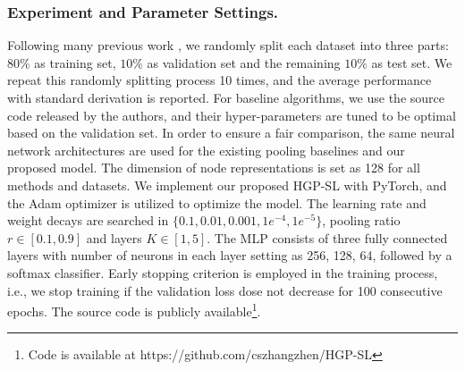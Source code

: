 \documentclass[letterpaper]{article} \usepackage{aaai20}  \usepackage{times}  \usepackage{helvet} \usepackage{courier}  \usepackage[hyphens]{url}  \usepackage{graphicx} \urlstyle{rm} \def\UrlFont{\rm}  \usepackage{graphicx}  \frenchspacing  \setlength{\pdfpagewidth}{8.5in}  \setlength{\pdfpageheight}{11in}
\begin{document}
\subsubsection{Experiment and Parameter Settings.}
Following many previous work \cite{ying2018hierarchical,ma2019graph}, we randomly split each dataset into three parts: $80\%$ as training set, $10\%$ as validation set and the remaining $10\%$ as test set. We repeat this randomly splitting process 10 times, and the average performance with standard derivation is reported. For baseline algorithms, we use the source code released by the authors, and their hyper-parameters are tuned to be optimal based on the validation set. In order to ensure a fair comparison, the same neural network architectures are used for the existing pooling baselines and our proposed model. The dimension of node representations is set as 128 for all methods and datasets. We implement our proposed HGP-SL with PyTorch, and the Adam optimizer is utilized to optimize the model. The learning rate and weight decays are searched in $\{0.1,0.01,0.001,1e^{-4},1e^{-5}\}$, pooling ratio $r \in [0.1,0.9]$ and layers $K \in [1,5]$. The MLP consists of three fully connected layers with number of neurons in each layer setting as 256, 128, 64, followed by a softmax classifier. Early stopping criterion is employed in the training process, i.e., we stop training if the validation loss dose not decrease for 100 consecutive epochs. The source code is publicly available\footnote{Code is available at https://github.com/cszhangzhen/HGP-SL}.
\end{document}
